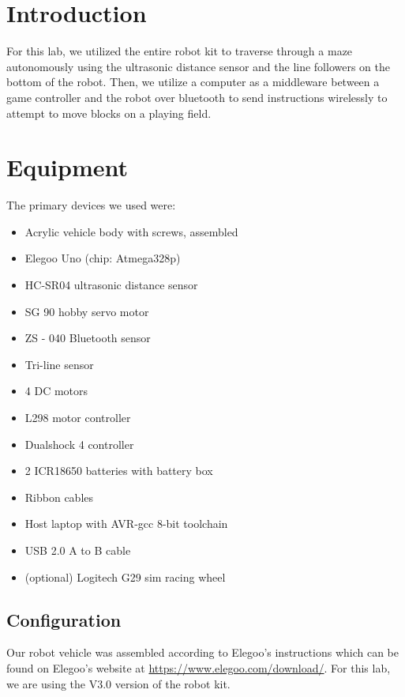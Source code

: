 \documentclass[letterpaper,11pt]{texMemo} %
\begin{document}
\maketitle %


\section*{Introduction}
For this lab, we utilized the entire robot kit to traverse through a 
maze autonomously using the ultrasonic distance sensor and the line
followers on the bottom of the robot. Then, we utilize a computer as a
middleware between a game controller and the robot over bluetooth to send 
instructions wirelessly to attempt to move blocks on a playing field.

\section*{Equipment}
The primary devices we used were:

\begin{itemize}
    \item Acrylic vehicle body with screws, assembled
    \item Elegoo Uno (chip: Atmega328p)
    \item HC-SR04 ultrasonic distance sensor
    \item SG 90 hobby servo motor
    \item ZS - 040 Bluetooth sensor
    \item Tri-line sensor
    \item 4 DC motors
    \item L298 motor controller
    \item Dualshock 4 controller
    \item 2 ICR18650 batteries with battery box
    \item Ribbon cables
    \item Host laptop with AVR-gcc 8-bit toolchain
    \item USB 2.0 A to B cable
    \item (optional) Logitech G29 sim racing wheel
\end{itemize}

\subsection*{Configuration}
Our robot vehicle was assembled according to Elegoo's instructions which can be found
on Elegoo's website at \url{https://www.elegoo.com/download/}. For this lab, we are
using the V3.0 version of the robot kit.
\end{document}
